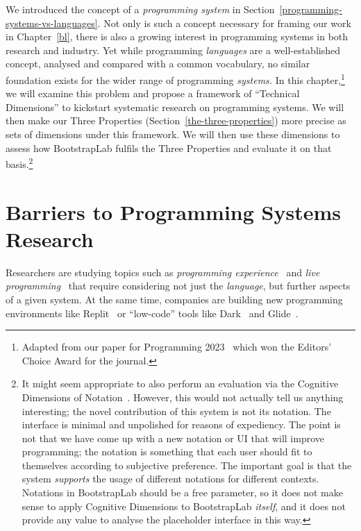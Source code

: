 \documentclass[ twoside,openright,titlepage,numbers=noenddot,headinclude,footinclude,cleardoublepage=empty,abstract=on,
                BCOR=5mm,paper=a4,fontsize=11pt
                ]{scrreprt}
\theoremstyle{definition}
\begin{document}
We introduced the concept of a \emph{programming system} in
Section~\ref{programming-systems-vs-languages}. Not only is such a
concept necessary for framing our work in Chapter~\ref{bl}, there is
also a growing interest in programming systems in both research and
industry. Yet while programming \emph{languages} are a well-established
concept, analysed and compared with a common vocabulary, no similar
foundation exists for the wider range of programming \emph{systems.} In
this chapter,\footnote{Adapted from our paper for Programming
  2023~\parencite{TechDims} which won the Editors' Choice Award for the
  journal.} we will examine this problem and propose a framework of
``Technical Dimensions'' to kickstart systematic research on programming
systems. We will then make our Three Properties
(Section~\ref{the-three-properties}) more precise as sets of dimensions
under this framework. We will then use these dimensions to assess how
BootstrapLab fulfils the Three Properties and evaluate it on that
basis.\footnote{It might seem appropriate to also perform an evaluation
  via the Cognitive Dimensions of Notation~\parencite{CogDims}. However,
  this would not actually tell us anything interesting; the novel
  contribution of this system is not its notation. The interface is
  minimal and unpolished for reasons of expediency. The point is not
  that we have come up with a new notation or UI that will improve
  programming; the notation is something that each user should fit to
  themselves according to subjective preference. The important goal is
  that the system \emph{supports} the usage of different notations for
  different contexts. Notations in BootstrapLab should be a free
  parameter, so it does not make sense to apply Cognitive Dimensions to
  BootstrapLab \emph{itself}, and it does not provide any value to
  analyse the placeholder interface in this way.}

\hypertarget{barriers-to-programming-systems-research}{\section{Barriers to Programming Systems
Research}\label{barriers-to-programming-systems-research}}

Researchers are studying topics such as \emph{programming
experience}~\parencite{PX} and \emph{live programming}~\parencite{LIVE}
that require considering not just the \emph{language}, but further
aspects of a given system. At the same time, companies are building new
programming environments like Replit~\parencite{ReplitWeb} or
``low-code'' tools like Dark~\parencite{DarkWeb} and
Glide~\parencite{GlideWeb}.
\end{document}
